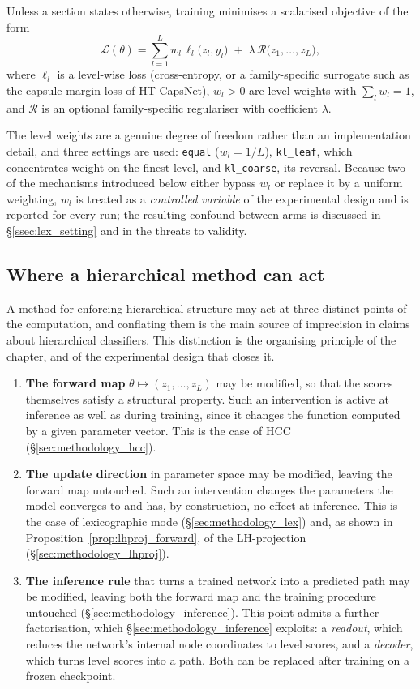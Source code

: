 Unless a section states otherwise, training minimises a scalarised objective of
the form
\[
\mathcal{L}(\theta)
=
\sum_{l=1}^{L} w_l\,\ell_l\big(z_l,y_l\big)
\;+\;
\lambda\,\mathcal{R}\big(z_1,\dots,z_L\big),
\]
where $\ell_l$ is a level-wise loss (cross-entropy, or a family-specific
surrogate such as the capsule margin loss of HT-CapsNet), $w_l>0$ are level
weights with $\sum_l w_l=1$, and $\mathcal{R}$ is an optional family-specific
regulariser with coefficient $\lambda$.

The level weights are a genuine degree of freedom rather than an implementation
detail, and three settings are used: \texttt{equal} ($w_l=1/L$),
\texttt{kl\_leaf}, which concentrates weight on the finest level, and
\texttt{kl\_coarse}, its reversal. Because two of the mechanisms introduced below
either bypass $w_l$ or replace it by a uniform weighting, $w_l$ is treated as a
\emph{controlled variable} of the experimental design and is reported for every
run; the resulting confound between arms is discussed in
\S\ref{ssec:lex_setting} and in the threats to validity.

\subsection{Where a hierarchical method can act}
\label{ssec:problem_train_vs_inference}

A method for enforcing hierarchical structure may act at three distinct points of
the computation, and conflating them is the main source of imprecision in claims
about hierarchical classifiers. This distinction is the organising principle of
the chapter, and of the experimental design that closes it.

\begin{enumerate}
    \item \textbf{The forward map} $\theta\mapsto(z_1,\dots,z_L)$ may be modified,
    so that the scores themselves satisfy a structural property. Such an
    intervention is active at inference as well as during training, since it
    changes the function computed by a given parameter vector. This is the case of
    HCC (\S\ref{sec:methodology_hcc}).
    \item \textbf{The update direction} in parameter space may be modified,
    leaving the forward map untouched. Such an intervention changes the parameters
    the model converges to and has, by construction, no effect at inference. This
    is the case of lexicographic mode (\S\ref{sec:methodology_lex}) and, as shown
    in Proposition~\ref{prop:lhproj_forward}, of the LH-projection
    (\S\ref{sec:methodology_lhproj}).
    \item \textbf{The inference rule} that turns a trained network into a
    predicted path may be modified, leaving both the forward map and the training
    procedure untouched (\S\ref{sec:methodology_inference}). This point admits a
    further factorisation, which \S\ref{sec:methodology_inference} exploits: a
    \emph{readout}, which reduces the network's internal node coordinates to level
    scores, and a \emph{decoder}, which turns level scores into a path. Both can be
    replaced after training on a frozen checkpoint.
\end{enumerate}

